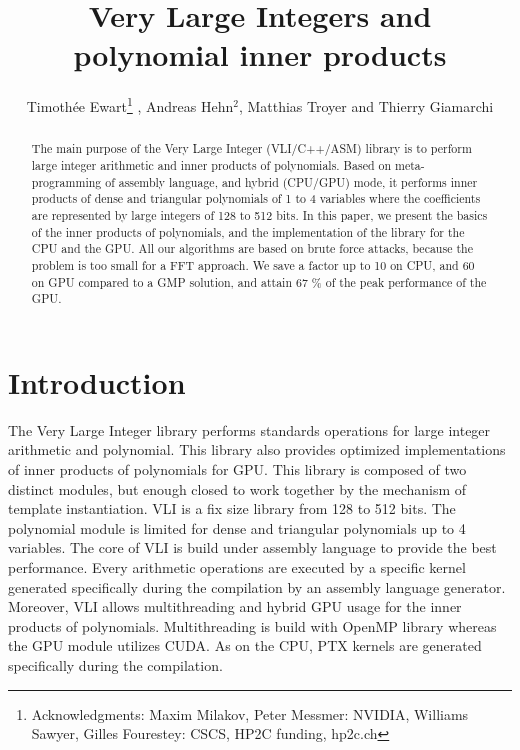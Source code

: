\documentclass[oribibl]{llncs2e/llncs}
\title{Very Large Integers  and polynomial inner products}
\author{Timoth\'ee Ewart\inst{1}\thanks{Acknowledgments: Maxim Milakov, Peter Messmer:   NVIDIA,   Williams Sawyer, Gilles Fourestey:  CSCS, HP2C funding, hp2c.ch}  , Andreas Hehn$^2$, Matthias Troyer\inst{2} and Thierry Giamarchi\inst{1}}
\institute{Universit\'e de Gen\`eve, \email{timothee.ewart@gmail.com}  \and Eidgen\"ossische Technische Hochschule Z\"urich }
\begin{document}
\maketitle
\begin{abstract}
The main purpose of the  Very Large Integer (VLI/C++/ASM) library is to perform large integer arithmetic and  inner products of polynomials. Based on meta-programming of assembly language,
and  hybrid (CPU/GPU) mode, it performs inner products of dense and triangular polynomials  of 1 to 4 variables  where the coefficients are represented  by large integers of 128 to 512 bits. 
In this paper, we present the basics of the inner products of polynomials, and  the implementation of the library for the CPU and the GPU.  All our algorithms are based on brute force attacks, because the problem is too small for a FFT approach. We save a factor up to 10 on CPU, and 60 on GPU compared to a GMP solution,
and attain 67 \% of the peak performance of the GPU.
\end{abstract}
\section{Introduction}

The Very Large Integer library performs  standards  operations for large integer arithmetic and polynomial. This library also provides optimized implementations of inner products  of polynomials for GPU.
This library is composed of two distinct modules,  but enough closed  to work together by the mechanism of template instantiation. VLI is a fix size library from 128 to 512 bits.
The polynomial module  is limited for dense and triangular polynomials  up to 4 variables. The core of VLI is build under assembly language to provide the best performance.  Every arithmetic operations
are executed by a specific kernel generated specifically during the compilation by an assembly language generator. Moreover, VLI allows multithreading and hybrid  GPU usage for the inner products of polynomials.
Multithreading is build with OpenMP library whereas the GPU module utilizes CUDA. As on the CPU, PTX kernels are generated specifically during the compilation.
\end{document}
